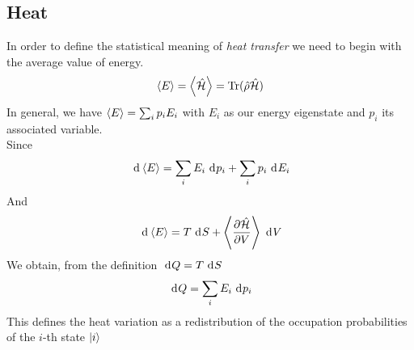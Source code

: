 \documentclass[../qm.tex]{subfiles}
\begin{document}
		\subsection{Heat}
		In order to define the statistical meaning of \textit{heat transfer} we need to begin with the average value of energy.
		\begin{equation}
			\expval{E}=\expval{\hat{\mathcal{H}}}=\mathrm{Tr}(\hat{\rho}\hat{\mathcal{H}})
			\label{eq:expvaleheat}
		\end{equation}
		In general, we have $\expval{E}=\sum_ip_iE_i$ with $E_i$ as our energy eigenstate and $p_i$ its associated variable.\\
		Since
		\begin{equation*}
			\ \mathrm{d}^{}\expval{E}=\sum_iE_i\ \mathrm{d}^{}p_i+\sum_ip_i\ \mathrm{d}^{}E_i
		\end{equation*}
		And
		\begin{equation*}
			\ \mathrm{d}^{}\expval{E}=T\ \mathrm{d}^{}S+\expval{\pdv{\hat{\mathcal{H}}}{V}}\ \mathrm{d}^{}V
		\end{equation*}
		We obtain, from the definition $\ \mathrm{d}^{}Q=T\ \mathrm{d}^{}S$
		\begin{equation}
			\ \mathrm{d}^{}Q=\sum_iE_i\ \mathrm{d}^{}p_i
			\label{eq:heatdiff}
		\end{equation}
		This defines the heat variation as a redistribution of the occupation probabilities of the $i$-th state $\ket{i}$
\end{document}
